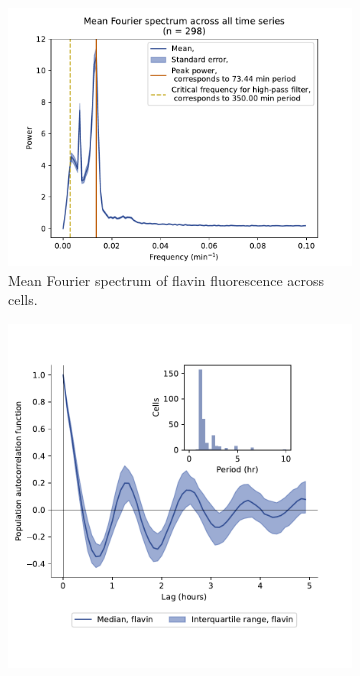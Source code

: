 \begin{figure}
  \centering
  \begin{subfigure}[htpb]{0.4\textwidth}
   \centering
   \includegraphics[width=\textwidth]{by4741_491_13}
   \caption{
    Mean Fourier spectrum of flavin fluorescence across cells.%
   }
   \label{fig:biology-by4741-sync-fourier}
  \end{subfigure}%
  \begin{subfigure}[htpb]{0.4\textwidth}
   \centering
   \includegraphics[width=\textwidth]{by4741_491_12}

\end{subfigure}
\end{figure}
